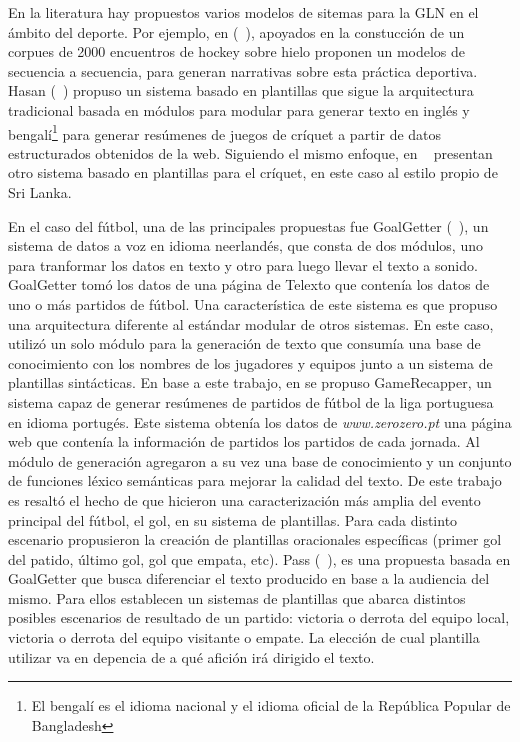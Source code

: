     En la literatura hay propuestos varios modelos de sitemas para la GLN en el ámbito del deporte. Por ejemplo, en (~\cite{kanerva2019template}), apoyados en la constucción de un corpues de 2000 encuentros de hockey sobre hielo 
proponen un modelos de secuencia a secuencia, para generan narrativas sobre esta práctica deportiva. Hasan (~\cite{hasan2011automatic}) propuso un sistema basado en plantillas que sigue la arquitectura tradicional basada en módulos para 
modular para generar texto en inglés y bengalí\footnote[5]{El bengalí es el idioma nacional y el idioma oficial de la República Popular de Bangladesh} para generar resúmenes de juegos de críquet a partir de datos estructurados obtenidos de la web. 
Siguiendo el mismo enfoque, en ~\cite{gu2016incorporating} presentan otro sistema basado en plantillas para el críquet, en este caso al estilo propio de Sri Lanka.
 
En el caso del fútbol, una de las principales propuestas fue GoalGetter (~\cite{theune2001data}), un sistema de datos a voz en idioma neerlandés, que consta de dos módulos, uno para tranformar los datos en texto y 
otro para luego llevar el texto a sonido. GoalGetter tomó los datos de una página de Telexto que contenía los datos de uno o más partidos de fútbol. Una característica de este sistema es que propuso una arquitectura diferente al 
estándar modular de otros sistemas. En este caso, utilizó un solo módulo para la generación de texto que consumía una base de conocimiento con los nombres de los jugadores y equipos junto a un sistema de plantillas sintácticas.
 En base a este trabajo, en \cite{aires2016automatic} se propuso GameRecapper, un sistema capaz de generar resúmenes de partidos de fútbol de la liga portuguesa en idioma portugés. Este sistema obtenía los datos de \textit{www.zerozero.pt} 
una página web que contenía la información de partidos los partidos de cada jornada. Al módulo de generación agregaron a su vez una base de conocimiento y un conjunto de funciones léxico semánticas para mejorar la calidad del texto. De este trabajo es resaltó el hecho 
de que hicieron una caracterización más amplia del evento principal del fútbol, el gol, en su sistema de plantillas. Para cada distinto escenario propusieron la creación de plantillas oracionales específicas (primer gol del patido, último gol, gol que empata, etc).
Pass (~\cite{van2017pass}), es una propuesta basada en GoalGetter que busca diferenciar el texto producido en base a la audiencia del mismo. Para ellos establecen un sistemas de plantillas que abarca distintos posibles escenarios de resultado de un partido: victoria o derrota 
del equipo local, victoria o derrota del equipo visitante o empate. La elección de cual plantilla utilizar va en depencia de a qué afición irá dirigido el texto.  

